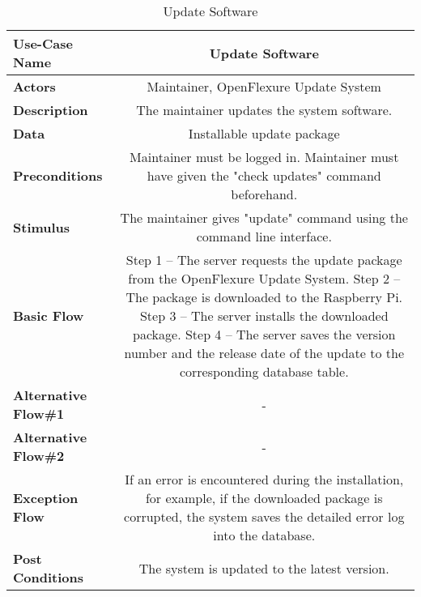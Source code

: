 \begin{table}[H]
     \centering
     \begin{tabular}{|l|C|}
         \hline
          \textbf{Use-Case Name} & Update Software \\
         \hline
          \textbf{Actors} & Maintainer, OpenFlexure Update System \\ 
         \hline
          \textbf{Description} & The maintainer updates the system software.\\ 
         \hline
          \textbf{Data} & Installable update package\\ 
         \hline
          \textbf{Preconditions} & 
          Maintainer must be logged in. \newline
          Maintainer must have given the "check updates" command beforehand.\\
         \hline
          \textbf{Stimulus} & The maintainer gives "update" command using the command line interface.\\ 
         \hline
          \textbf{Basic Flow} & 
          Step 1 -- The server requests the update package from the OpenFlexure Update System. \newline
          Step 2 -- The package is downloaded to the Raspberry Pi. \newline
          Step 3 -- The server installs the downloaded package. \newline
          Step 4 -- The server saves the version number and the release date of the update to the corresponding database table. \\
         \hline
          \textbf{Alternative Flow\#1} & - \\
         \hline
          \textbf{Alternative Flow\#2} & - \\
         \hline
          \textbf{Exception Flow} & If an error is encountered during the installation, for example, if the downloaded package is corrupted, the system saves the detailed error log into the database. \\
         \hline
          \textbf{Post Conditions} & The system is updated to the latest version. \\ 
         \hline
     \end{tabular}
     \caption{Update Software}
     \label{tab:update_software}
 \end{table}